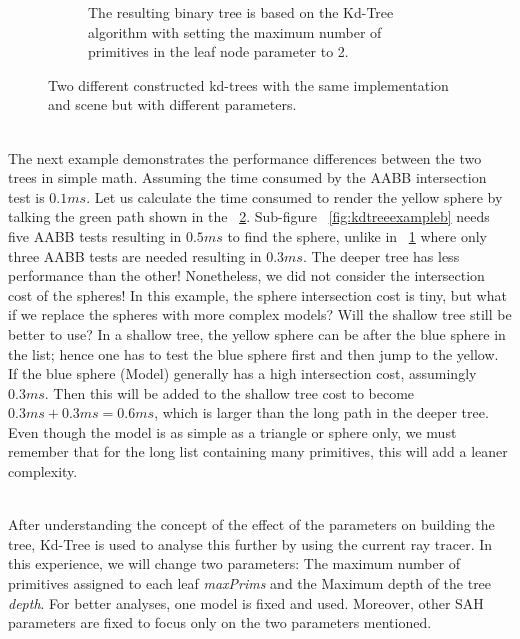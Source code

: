\documentclass[11pt,a4paper]{article}
\begin{document}
\begin{figure}[H]
\begin{subfigure}[b]{0.6\textwidth}
         \caption{The resulting binary tree is based on the Kd-Tree algorithm with setting the maximum number of primitives in the leaf node parameter to 2.
}
         \label{fig:kdtreeexampled}
     \end{subfigure}
        \captionsetup{justification=centering,margin=2cm}
        \caption{Two different constructed kd-trees with the same implementation and scene but with different parameters.}
        \label{fig:kdtreeexample}
\end{figure}

\noindent
\\
The next example demonstrates the performance differences between the two trees in simple math. Assuming the time consumed by the AABB intersection test is $0.1ms$. Let us calculate the time consumed to render the yellow sphere by talking the green path shown in the ~\ref{fig:kdtreeexample}. Sub-figure ~\ref{fig:kdtreeexampleb}
 needs five AABB tests resulting in $0.5ms$ to find the sphere, unlike in ~\ref{fig:kdtreeexampled}
 where only three AABB tests are needed resulting in $0.3ms$. The deeper tree has less performance than the other! Nonetheless, we did not consider the intersection cost of the spheres! In this example, the sphere intersection cost is tiny, but what if we replace the spheres with more complex models? Will the shallow tree still be better to use? In a shallow tree, the yellow sphere can be after the blue sphere in the list; hence one has to test the blue sphere first and then jump to the yellow. If the blue sphere (Model) generally has a high intersection cost, assumingly $0.3ms$. Then this will be added to the shallow tree cost to become $0.3ms + 0.3ms = 0.6ms$, which is larger than the long path in the deeper tree. Even though the model is as simple as a triangle or sphere only, we must remember that for the long list containing many primitives, this will add a leaner complexity.

\noindent
\\
After understanding the concept of the effect of the parameters on building the tree, Kd-Tree is used to analyse this further by using the current ray tracer. In this experience, we will change two parameters: The maximum number of primitives assigned to each leaf \textit{maxPrims} and the Maximum depth of the tree \textit{depth}. For better analyses, one model is fixed and used. Moreover, other SAH parameters are fixed to focus only on the two parameters mentioned. 
\end{document}
